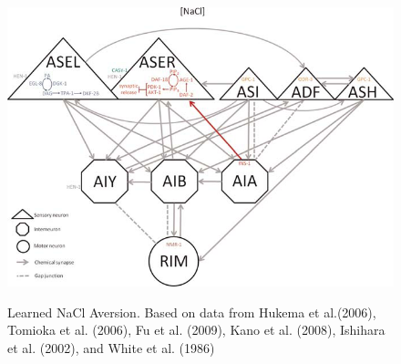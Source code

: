 \begin{figure}[h!]
  \caption{Learned NaCl Aversion. Based on data from Hukema et al.(2006), Tomioka et al. (2006), Fu et al. (2009), Kano et al. (2008), Ishihara et al. (2002), and White et al. (1986)}
  \centering
  \includegraphics[scale=0.8]{graphics/LearnedNaClAversion}
  \label{fig:NaCl_aversion}
\end{figure}

